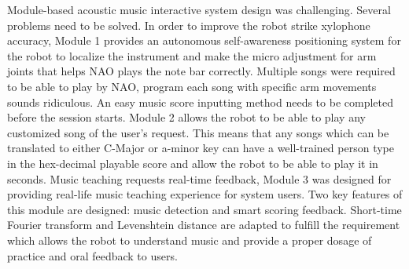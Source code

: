 Module-based acoustic music interactive system design was challenging. Several problems need
to be solved. In order to improve the robot strike xylophone accuracy, Module 1 provides an autonomous 
self-awareness positioning system for the robot to localize the instrument and make the micro adjustment 
for arm joints that helps NAO plays the note bar correctly. Multiple songs were required to be able to 
play by NAO, program each song with specific arm movements sounds ridiculous. An easy music score
inputting method needs to be completed before the session starts. Module 2 allows the robot to be able 
to play any customized song of the user's request. This means that any songs which can be translated 
to either C-Major or a-minor key can have a well-trained person type in the hex-decimal playable 
score and allow the robot to be able to play it in seconds. Music teaching requests real-time feedback,
Module 3 was designed for providing real-life music teaching experience for system users. Two key features
of this module are designed: music detection and smart scoring feedback. Short-time Fourier transform
and Levenshtein distance are adapted to fulfill the requirement which allows the robot to understand
music and provide a proper dosage of practice and oral feedback to users.\\

